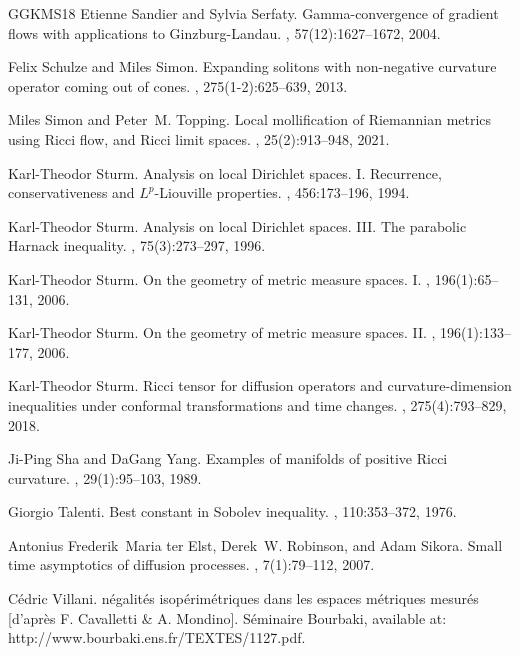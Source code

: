 \documentclass[11pt]{article}
\numberwithin{equation}{section}
\begin{document}
{\begin{thebibliography}{GGKMS18}
Etienne Sandier and Sylvia Serfaty.
\newblock Gamma-convergence of gradient flows with applications to
  {G}inzburg-{L}andau.
, 57(12):1627--1672, 2004.

Felix Schulze and Miles Simon.
\newblock Expanding solitons with non-negative curvature operator coming out of
  cones.
, 275(1-2):625--639, 2013.

Miles Simon and Peter~M. Topping.
\newblock Local mollification of {R}iemannian metrics using {R}icci flow, and
  {R}icci limit spaces.
, 25(2):913--948, 2021.

Karl-Theodor Sturm.
\newblock Analysis on local {D}irichlet spaces. {I}. {R}ecurrence,
  conservativeness and {$L^p$}-{L}iouville properties.
, 456:173--196, 1994.

Karl-Theodor Sturm.
\newblock Analysis on local {D}irichlet spaces. {III}. {T}he parabolic
  {H}arnack inequality.
, 75(3):273--297, 1996.

Karl-Theodor Sturm.
\newblock On the geometry of metric measure spaces. {I}.
, 196(1):65--131, 2006.

Karl-Theodor Sturm.
\newblock On the geometry of metric measure spaces. {II}.
, 196(1):133--177, 2006.

Karl-Theodor Sturm.
\newblock Ricci tensor for diffusion operators and curvature-dimension
  inequalities under conformal transformations and time changes.
, 275(4):793--829, 2018.

Ji-Ping Sha and DaGang Yang.
\newblock Examples of manifolds of positive {R}icci curvature.
, 29(1):95--103, 1989.

Giorgio Talenti.
\newblock Best constant in {S}obolev inequality.
, 110:353--372, 1976.

Antonius Frederik~Maria ter Elst, Derek~W. Robinson, and Adam Sikora.
\newblock Small time asymptotics of diffusion processes.
, 7(1):79--112, 2007.

C{\'e}dric Villani.
n\'egalit\'es isop\'erim\'etriques dans les espaces m\'etriques
  mesur\'es [d'apr\`es {F}. {C}avalletti \& {A}. {M}ondino].
\newblock S\'eminaire {B}ourbaki, available at:
  http://www.bourbaki.ens.fr/TEXTES/1127.pdf.


\end{thebibliography}}
\end{document}
